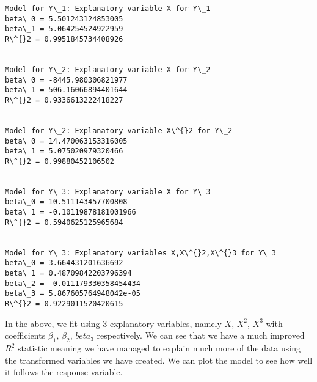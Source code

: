 \documentclass[11pt]{article}
\begin{document}
    \begin{Verbatim}[commandchars=\\\{\}]
Model for Y\_1: Explanatory variable X for Y\_1
beta\_0 = 5.501243124853005
beta\_1 = 5.064254524922959
R\^{}2 = 0.9951845734408926


Model for Y\_2: Explanatory variable X for Y\_2
beta\_0 = -8445.980306821977
beta\_1 = 506.16066894401644
R\^{}2 = 0.9336613222418227


Model for Y\_2: Explanatory variable X\^{}2 for Y\_2
beta\_0 = 14.470063153316005
beta\_1 = 5.075020979320466
R\^{}2 = 0.99880452106502


Model for Y\_3: Explanatory variable X for Y\_3
beta\_0 = 10.511143457700808
beta\_1 = -0.10119878181001966
R\^{}2 = 0.5940625125965684


Model for Y\_3: Explanatory variables X,X\^{}2,X\^{}3 for Y\_3
beta\_0 = 3.664431201636692
beta\_1 = 0.48709842203796394
beta\_2 = -0.011179330358454434
beta\_3 = 5.867605764948042e-05
R\^{}2 = 0.9229011520420615

    \end{Verbatim}

    In the above, we fit using 3 explanatory variables, namely \(X\),
\(X^2\), \(X^3\) with coefficients \(\beta_1\), \(\beta_2\), \(beta_3\)
respectively. We can see that we have a much improved \(R^2\) statistic
meaning we have managed to explain much more of the data using the
transformed variables we have created. We can plot the model to see how
well it follows the response variable.
\end{document}
